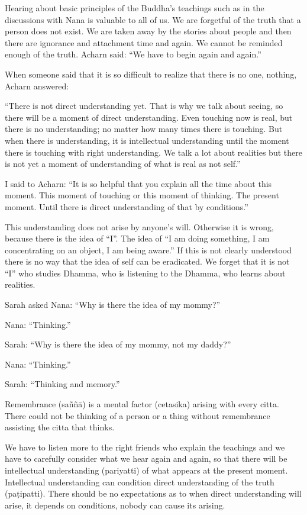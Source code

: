 Hearing about basic principles of the Buddha's teachings such as in the
discussions with Nana is valuable to all of us. We are forgetful of the
truth that a person does not exist. We are taken away by the stories
about people and then there are ignorance and attachment time and again.
We cannot be reminded enough of the truth. Acharn said: ``We have to
begin again and again.''

When someone said that it is so difficult to realize that there is no
one, nothing, Acharn answered:

``There is not direct understanding yet. That is why we talk about
seeing, so there will be a moment of direct understanding. Even touching
now is real, but there is no understanding; no matter how many times
there is touching. But when there is understanding, it is intellectual
understanding until the moment there is touching with right
understanding. We talk a lot about realities but there is not yet a
moment of understanding of what is real as not self.''

I said to Acharn: ``It is so helpful that you explain all the time about
this moment. This moment of touching or this moment of thinking. The
present moment. Until there is direct understanding of that by
conditions.''

This understanding does not arise by anyone's will. Otherwise it is
wrong, because there is the idea of ``I''. The idea of ``I am doing
something, I am concentrating on an object, I am being aware.'' If this
is not clearly understood there is no way that the idea of self can be
eradicated. We forget that it is not ``I'' who studies Dhamma, who is
listening to the Dhamma, who learns about realities.

Sarah asked Nana: ``Why is there the idea of my mommy?''

Nana: ``Thinking.''

Sarah: ``Why is there the idea of my mommy, not my daddy?''

Nana: ``Thinking.''

Sarah: ``Thinking and memory.''

Remembrance (saññā) is a mental factor (cetasika) arising with every
citta. There could not be thinking of a person or a thing without
remembrance assisting the citta that thinks.

We have to listen more to the right friends who explain the teachings
and we have to carefully consider what we hear again and again, so that
there will be intellectual understanding (pariyatti) of what appears at
the present moment. Intellectual understanding can condition direct
understanding of the truth (paṭipatti). There should be no expectations
as to when direct understanding will arise, it depends on conditions,
nobody can cause its arising.

